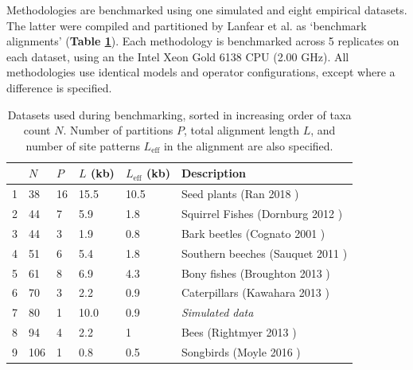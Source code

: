 \documentclass[10pt,letterpaper]{article}
\begin{document}
Methodologies are benchmarked using one simulated and eight empirical datasets.
The latter were compiled \cite{lanfear2019Github} and partitioned \cite{lanfear2016partitionfinder} by Lanfear et al. as `benchmark alignments' (\textbf{Table \ref{table:datasets}}).
Each methodology is benchmarked across 5 replicates on each dataset, using an the Intel Xeon Gold 6138 CPU (2.00 GHz).
All methodologies use identical models and operator configurations, except where a difference is specified.





\begin{table}[h!]
\centering
\begin{tabular}{|l| l l l l l|} 
 \hline
  & $N$ & $P$ & $L$ (kb) & $L_\text{eff}$ (kb) & \textbf{Description} \\
  \hline
 
 
 1  &  38  &  16  &  15.5  &  10.5  &  Seed plants (Ran 2018 \cite{Ran_2018}) \\ 

2  &  44  &  7  &  5.9  &  1.8  &  Squirrel Fishes (Dornburg 2012 \cite{Dornburg_2012}) \\ 

3  &  44  &  3  &  1.9  &  0.8  &  Bark beetles (Cognato 2001 \cite{Cognato_2001}) \\ 

4  &  51  &  6  &  5.4  &  1.8  &  Southern beeches (Sauquet 2011 \cite{Sauquet_2011}) \\ 

5  &  61  &  8  &  6.9  &  4.3  &  Bony fishes (Broughton 2013 \cite{Broughton_2013}) \\ 

6  &  70  &  3  &  2.2  &  0.9  &  Caterpillars (Kawahara 2013 \cite{Kawahara_2013}) \\ 

7  &  80  &  1 &  10.0  &  0.9  &  \textit{Simulated data}  \\ 

8  &  94  &  4  &  2.2  &  1  &  Bees (Rightmyer 2013 \cite{Rightmyer_2013}) \\ 

9  &  106  &  1  &  0.8  &  0.5  &  Songbirds (Moyle 2016 \cite{Moyle_2016}) \\ 





 \hline
\end{tabular}
\caption{Datasets used during benchmarking, sorted in increasing order of taxa count $N$. Number of partitions $P$, total alignment length $L$, and number of site patterns $L_\text{eff}$ in the alignment are also specified.}
\label{table:datasets}
\end{table}
\end{document}
